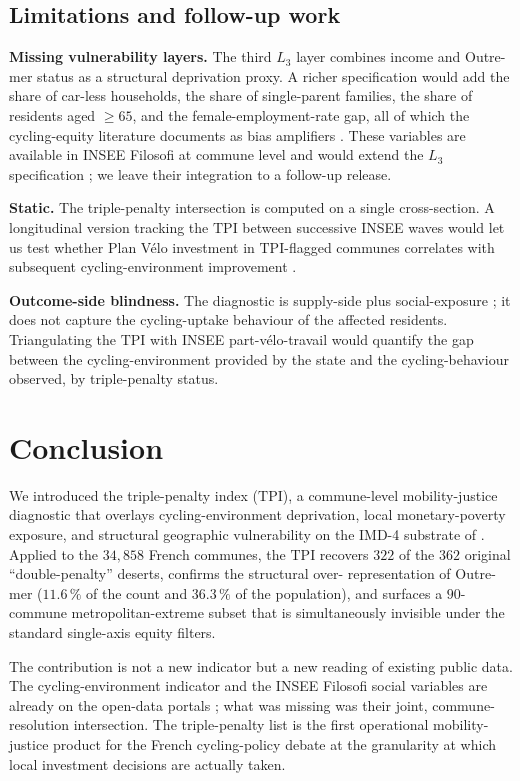 \documentclass[11pt,a4paper]{article}
\newcommand{\TPI}{\mathrm{TPI}}
\begin{document}
\subsection{Limitations and follow-up work}

\textbf{Missing vulnerability layers.}  The third $L_3$ layer
combines income and Outre-mer status as a structural deprivation
proxy.  A richer specification would add the share of car-less
households, the share of single-parent families, the share of
residents aged $\geq 65$, and the female-employment-rate gap,
all of which the cycling-equity literature documents as bias
amplifiers \citep{Garrard2008,Aldred2016,Mattioli2017}.  These
variables are available in INSEE Filosofi at commune level and
would extend the $L_3$ specification ; we leave their integration
to a follow-up release.

\textbf{Static.}  The triple-penalty intersection is computed on
a single cross-section.  A longitudinal version tracking the
$\TPI$ between successive INSEE waves would let us test whether
Plan V\'elo investment in $\TPI$-flagged communes correlates with
subsequent cycling-environment improvement
\citep{Abadie2010,Abadie2021}.

\textbf{Outcome-side blindness.}  The diagnostic is supply-side
plus social-exposure ; it does not capture the cycling-uptake
behaviour of the affected residents.  Triangulating the $\TPI$
with INSEE part-v\'elo-travail \citep{INSEEMobPro2022} would
quantify the gap between the cycling-environment provided by the
state and the cycling-behaviour observed, by triple-penalty
status.

\section{Conclusion}
\label{sec:conclusion}

We introduced the triple-penalty index ($\TPI$), a commune-level
mobility-justice diagnostic that overlays cycling-environment
deprivation, local monetary-poverty exposure, and structural
geographic vulnerability on the IMD-4 substrate of
\citet{Fosse2026imd_national}.  Applied to the $34{,}858$ French
communes, the $\TPI$ recovers $322$ of the $362$ original
``double-penalty'' deserts, confirms the structural over-
representation of Outre-mer ($11.6\,\%$ of the count and
$36.3\,\%$ of the population), and surfaces a $90$-commune
metropolitan-extreme subset that is simultaneously invisible
under the standard single-axis equity filters.

The contribution is not a new indicator but a new reading of
existing public data.  The cycling-environment indicator and the
INSEE Filosofi social variables are already on the open-data
portals ; what was missing was their joint, commune-resolution
intersection.  The triple-penalty list is the first operational
mobility-justice product for the French cycling-policy debate at
the granularity at which local investment decisions are actually
taken.


\end{document}
